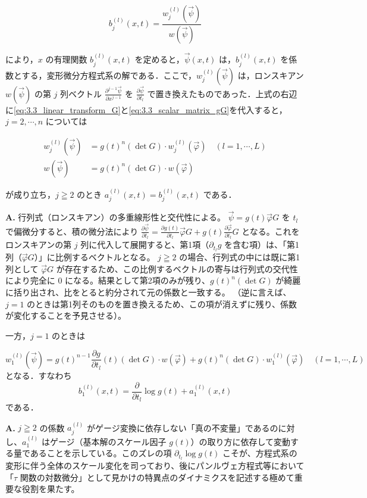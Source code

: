 \[
  b_j^{(l)}(x,t) = \frac{w_j^{(l)}(\vec{\psi})}{w(\vec{\psi})}
\]

により，$x$ の有理関数 $b_j^{(l)}(x,t)$ を定めると，$\vec{\psi}(x,t)$ は，$b_j^{(l)}(x,t)$ を係数とする，変形微分方程式系の解である．ここで，$w_j^{(l)}(\vec{\psi})$ は，ロンスキアン $w(\vec{\psi})$ の第 $j$ 列ベクトル $\frac{\partial^{j-1}\vec{\psi}}{\partial x^{j-1}}$ を $\frac{\partial\vec{\psi}}{\partial t_l}$ で置き換えたものであった．上式の右辺に\eqref{eq:3.3_linear_transform_G}と\eqref{eq:3.3_scalar_matrix_gG}を代入すると，$j=2,\cdots,n$ については

\begin{align*}
  w_j^{(l)}(\vec{\psi}) &= g(t)^n (\det G) \cdot w_j^{(l)}(\vec{\varphi}) \quad (l=1,\cdots,L) \\
  w(\vec{\psi}) &= g(t)^n (\det G) \cdot w(\vec{\varphi})
\end{align*}

が成り立ち，$j \geqq 2$ のとき $a_j^{(l)}(x,t) = b_j^{(l)}(x,t)$ である．

\begin{Q}[$w_j^{(l)}(\vec{\psi})$ の計算において、なぜ $j \geqq 2$ のときのみ綺麗な比例関係が成り立ち、係数が不変（$a_j^{(l)} = b_j^{(l)}$）となるのか？]
\textbf{A.} 行列式（ロンスキアン）の多重線形性と交代性による。
$\vec{\psi} = g(t)\vec{\varphi}G$ を $t_l$ で偏微分すると、積の微分法により
$\frac{\partial \vec{\psi}}{\partial t_l} = \frac{\partial g(t)}{\partial t_l}\vec{\varphi}G + g(t)\frac{\partial \vec{\varphi}}{\partial t_l}G$
となる。これをロンスキアンの第 $j$ 列に代入して展開すると、第1項（$\partial_{t_l}g$ を含む項）は、「第1列（$\vec{\varphi}G$）」に比例するベクトルとなる。
$j \geqq 2$ の場合、行列式の中には既に第1列として $\vec{\varphi}G$ が存在するため、この比例するベクトルの寄与は行列式の交代性により完全に $0$ になる。結果として第2項のみが残り、$g(t)^n (\det G)$ が綺麗に括り出され、比をとると約分されて元の係数と一致する。
（逆に言えば、$j=1$ のときは第1列そのものを置き換えるため、この項が消えずに残り、係数が変化することを予見させる）。
\end{Q}

一方，$j=1$ のときは

\[
  w_1^{(l)}(\vec{\psi}) = g(t)^{n-1} \frac{\partial g}{\partial t_l}(t)(\det G) \cdot w(\vec{\varphi}) + g(t)^n (\det G) \cdot w_1^{(l)}(\vec{\varphi}) \quad (l=1,\cdots,L)
\]
となる．すなわち
\[
  b_1^{(l)}(x,t) = \frac{\partial}{\partial t_l} \log g(t) + a_1^{(l)}(x,t)
\]
である．

\begin{Q}[$j=1$ のときだけ係数が不変にならず、「対数微分 $\frac{\partial}{\partial t_l} \log g(t)$」のズレが生じることの理論的意義は何か？]
\textbf{A.} $j \geqq 2$ の係数 $a_j^{(l)}$ がゲージ変換に依存しない「真の不変量」であるのに対し、$a_1^{(l)}$ はゲージ（基本解のスケール因子 $g(t)$）の取り方に依存して変動する量であることを示している。このズレの項 $\partial_{t_l} \log g(t)$ こそが、方程式系の変形に伴う全体のスケール変化を司っており、後にパンルヴェ方程式等において「$\tau$ 関数の対数微分」として見かけの特異点のダイナミクスを記述する極めて重要な役割を果たす。
\end{Q}

